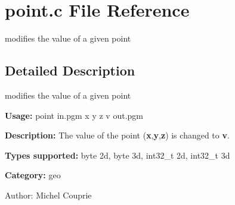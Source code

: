 \section{point.c File Reference}
\label{point_8c}
modifies the value of a given point  




\label{_details}
\subsection{Detailed Description}
modifies the value of a given point 

{\bf Usage:} point in.pgm x y z v out.pgm

{\bf Description:} The value of the point ({\bf x},{\bf y},{\bf z}) is changed to {\bf v}.

{\bf Types supported:} byte 2d, byte 3d, int32\_\-t 2d, int32\_\-t 3d

{\bf Category:} geo

\begin{Desc}
\item[Author:]Michel Couprie \end{Desc}

